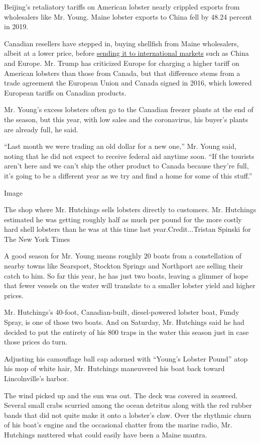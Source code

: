 Beijing's retaliatory tariffs on American lobster nearly crippled
exports from wholesalers like Mr. Young. Maine lobster exports to China
fell by 48.24 percent in 2019.

Canadian resellers have stepped in, buying shellfish from Maine
wholesalers, albeit at a lower price, before
\href{https://www.nytimes.com/2017/11/12/business/trump-trade-lobster-canada.html}{sending
it to international markets} such as China and Europe. Mr. Trump has
criticized Europe for charging a higher tariff on American lobsters than
those from Canada, but that difference stems from a trade agreement the
European Union and Canada signed in 2016, which lowered European tariffs
on Canadian products.

Mr. Young's excess lobsters often go to the Canadian freezer plants at
the end of the season, but this year, with low sales and the
coronavirus, his buyer's plants are already full, he said.

``Last month we were trading an old dollar for a new one,'' Mr. Young
said, noting that he did not expect to receive federal aid anytime soon.
``If the tourists aren't here and we can't ship the other product to
Canada because they're full, it's going to be a different year as we try
and find a home for some of this stuff.''

Image

The shop where Mr. Hutchings sells lobsters directly to customers. Mr.
Hutchings estimated he was getting roughly half as much per pound for
the more costly hard shell lobsters than he was at this time last
year.Credit...Tristan Spinski for The New York Times

A good season for Mr. Young means roughly 20 boats from a constellation
of nearby towns like Searsport, Stockton Springs and Northport are
selling their catch to him. So far this year, he has just two boats,
leaving a glimmer of hope that fewer vessels on the water will translate
to a smaller lobster yield and higher prices.

Mr. Hutchings's 40-foot, Canadian-built, diesel-powered lobster boat,
Fundy Spray, is one of those two boats. And on Saturday, Mr. Hutchings
said he had decided to put the entirety of his 800 traps in the water
this season just in case those prices do turn.

Adjusting his camouflage ball cap adorned with ``Young's Lobster Pound''
atop his mop of white hair, Mr. Hutchings maneuvered his boat back
toward Lincolnville's harbor.

The wind picked up and the sun was out. The deck was covered in seaweed.
Several small crabs scurried among the ocean detritus along with the red
rubber bands that did not quite make it onto a lobster's claw. Over the
rhythmic churn of his boat's engine and the occasional chatter from the
marine radio, Mr. Hutchings muttered what could easily have been a Maine
mantra.

